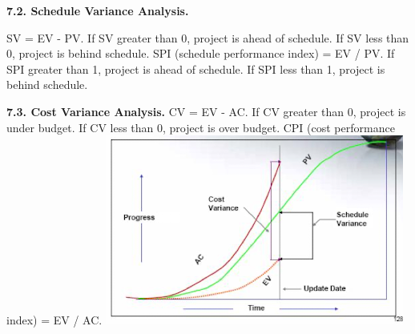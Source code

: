     \textbf{7.2. Schedule Variance Analysis.}
    
    SV = EV - PV. If SV greater than 0, project is ahead of schedule. If SV less than 0, project is behind schedule. SPI (schedule performance index) = EV / PV. If SPI greater than 1, project is ahead of schedule. If SPI less than 1, project is behind schedule.

    \textbf{7.3. Cost Variance Analysis.}
    CV = EV - AC. If CV greater than 0, project is under budget. If CV less than 0, project is over budget. CPI (cost performance index) = EV / AC.
    \includegraphics[width=\linewidth]{figs/SCR-20240606-pjgq.png}